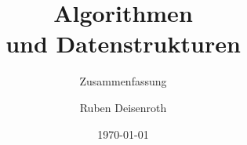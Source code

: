 \documentclass[
    ngerman,
    color=3b,
    load_common, %
    summary,
    boxarc,
]{tuda_summary}
\title[AuD]{Algorithmen\\und Datenstrukturen}
\subtitle{Zusammenfassung}
\author{Ruben Deisenroth}
\date{\today}
\begin{document}
\maketitle{}
\tableofcontents %
\clearpage

%    








\clearpage
\makeatletter
\g@addto@macro\imki@indexheaders\nobreak
\makeatother

\printindex
\end{document}
